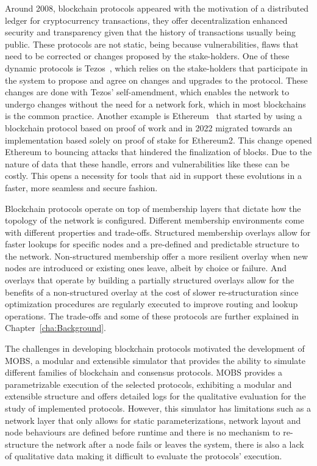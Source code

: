 Around 2008, blockchain protocols appeared with the motivation of 
a distributed ledger for cryptocurrency transactions, they offer decentralization enhanced security and transparency given that
the history of transactions usually being public. These protocols are not static, being because vulnerabilities,
flaws that need to be corrected or changes proposed by the stake-holders.
One of these dynamic protocols is Tezos~\cite{tezos}, which relies on the stake-holders that participate in the system to propose and
agree on changes and upgrades to the protocol. These changes are done with Tezos' self-amendment, which enables the network to undergo
changes without the need for a network fork, which in most blockchains is the common practice.
Another example is Ethereum~\cite{ethereum} that started by using a blockchain protocol based on proof
of work and in 2022 migrated towards an implementation based solely on proof of stake for Ethereum2. This change opened
Ethereum to bouncing attacks that hindered the finalization of blocks\cite{ethereum_analysis}.
Due to the nature of data that these handle, errors and vulnerabilities like these can be costly.
This opens a necessity for tools that aid in support these evolutions in a faster, more seamless and secure fashion.

Blockchain protocols operate on top of membership layers that dictate how the topology of the network is configured.
Different membership environments come with different properties and trade-offs. Structured membership overlays allow for faster lookups for
specific nodes and a pre-defined and predictable structure to the network. Non-structured membership offer a more resilient overlay when
new nodes are introduced or existing ones leave, albeit by choice or failure. And overlays that operate by building a partially structured
overlays allow for the benefits of a non-structured overlay at the cost of slower re-structuration since optimization
procedures are regularly executed to improve routing and lookup operations. The trade-offs and some of these protocols are further
explained in Chapter~\ref{cha:Background}.

The challenges in developing blockchain protocols motivated the development of MOBS, a modular and extensible simulator that provides
the ability to simulate different families of blockchain and consensus protocols.
MOBS provides a parametrizable execution of the selected protocols, exhibiting a modular and extensible structure and offers detailed logs for the
qualitative evaluation for the study of implemented protocols. However, this simulator has limitations such as a network layer
that only allows for static parameterizations, network layout and node behaviours are defined before runtime and there is no mechanism to
re-structure the network after a node fails or leaves the system, there is also a lack of qualitative data making it difficult to
evaluate the protocols' execution.

